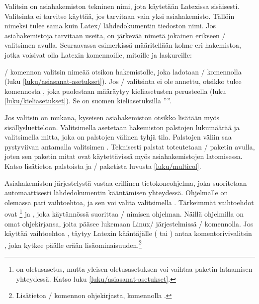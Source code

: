 Valitsin  on asiahakemiston tekninen nimi, jota käytetään
Latexissa sisäisesti. Valitsinta ei tarvitse käyttää, jos tarvitaan vain
yksi asiahakemisto. Tällöin nimeksi tulee sama kuin Latex\-/
lähdedokumentin tiedoston nimi. Jos asiahakemistoja tarvitaan useita, on
järkevää nimetä jokainen erikseen \-/ valitsimen avulla.
Seuraavassa esimerkissä määritellään kolme eri hakemistoa, jotka
voisivat olla Latexin komennoille, mitoille ja laskureille:

\begin{koodilohkosis}
\makeindex[name=komennot, title=Komennot, columns=2, intoc]
\makeindex[name=mitat,    title=Mitat,    columns=2, intoc]
\makeindex[name=laskurit, title=Laskurit, columns=2, intoc]
\end{koodilohkosis}

\noindent
{}\-/ komennon valitsin  nimeää otsikon
hakemistolle, joka ladotaan \-/ komennolla (luku
\ref{luku/asiasanat-asetukset}). Jos \-/ valitsinta ei ole
annettu, otsikko tulee komennosta , joka puolestaan
määräytyy kieliasetusten perusteella (luku \ref{luku/kieliasetukset}).
Se on suomen kieliasetuksilla ''\indexname''.

Jos valitsin  on mukana, kyseisen asiahakemiston otsikko
lisätään myös sisällysluetteloon. Valitsimella  asetetaan
hakemiston palstojen lukumäärää ja valitsimella  mitta,
joka on palstojen välinen tyhjä tila. Palstojen väliin saa pystyviivan
antamalla valitsimen . Teknisesti palstat
toteutetaan \-/ paketin avulla, joten sen paketin
mitat ovat käytettävissä myös asiahakemistojen latomisessa. Katso
lisätietoa palstoista ja \-/ paketista luvusta
\ref{luku/multicol}.

Asiahakemiston järjestelystä vastaa erillinen tietokoneohjelma, joka
suoritetaan automaattisesti lähdedokumentin kääntämisen yhteydessä.
Ohjelmalle on olemassa pari vaihtoehtoa, ja sen voi valita valitsimella
. Tärkeimmät vaihtoehdot ovat
\footnote{ on
  oletusasetus, mutta yleisen oletusasetuksen voi vaihtaa paketin
  lataamisen yhteydessä. Katso luku \ref{luku/asiasanat-asetukset}.} ja
, joka käytännössä suorittaa \-/ nimisen
ohjelman. Näillä ohjelmilla on omat ohjekirjansa, joita pääsee lukemaan
Linux\-/ järjestelmissä \-/ komennolla. Jos käyttää
vaihtoehtoa , täytyy Latexin kääntäjälle
( tai ) antaa komentorivivalitsin
, joka kytkee päälle erään
lisäominaisuuden.\footnote{Lisätietoa \-/ komennon
  ohjekirjasta, komennolla .}

